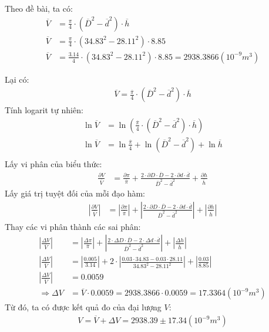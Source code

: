 \documentclass{article}
\begin{document}
Theo đề bài, ta có: 
\begin{align*}
    \overline{V} &= \frac{\pi}{4}\cdot(\overline{D}^2 - \overline{d}^2)\cdot\overline{h}\\
    \overline{V} &= \frac{\pi}{4}\cdot(34.83^2 - 28.11^2)\cdot 8.85\\
    \overline{V} &= \frac{3.14}{4}\cdot(34.83^2 - 28.11^2)\cdot 8.85 = 2938.3866(10^{-9} m^3)
\end{align*}

Lại có:
\begin{align*}
    \overline{V} = \frac{\overline{\pi}}{4}\cdot(\overline{D}^2 - \overline{d}^2)\cdot\overline{h}
\end{align*}
Tính logarit tự nhiên:
\begin{align*}
    \ln \overline{V} &= \ln(\frac{\overline{\pi}}{4}\cdot(\overline{D}^2 - \overline{d}^2)\cdot\overline{h})\\
    \ln \overline{V} &= \ln\frac{\overline{\pi}}{4} + \ln(\overline{D}^2 - \overline{d}^2) + \ln\overline{h}\\
\end{align*}
Lấy vi phân của biểu thức:
\begin{align*}
    \frac{\partial V}{\overline{V}} &= \frac{\partial\pi}{\overline{\pi}} + \frac{2\cdot\partial D\cdot \overline{D} - 2\cdot\partial d\cdot \overline{d}}{\overline{D}^2 - \overline{d}^2} + \frac{\partial h}{\overline{h}}
\end{align*}
Lấy giá trị tuyệt đối của mỗi đạo hàm:
\begin{align*}
    \left|\frac{\partial V}{\overline{V}}\right| &= \left|\frac{\partial\pi}{\overline{\pi}}\right| + \left|\frac{2\cdot\partial D\cdot \overline{D} - 2\cdot\partial d\cdot \overline{d}}{\overline{D}^2 - \overline{d}^2}\right| + \left|\frac{\partial h}{\overline{h}}\right|
\end{align*}
Thay các vi phân thành các sai phân:
\begin{align*}
    \left|\frac{\Delta V}{\overline{V}}\right| &= \left|\frac{\Delta\pi}{\overline{\pi}}\right| + \left|\frac{2\cdot\Delta D\cdot \overline{D} - 2\cdot\Delta d\cdot \overline{d}}{\overline{D}^2 - \overline{d}^2}\right| + \left|\frac{\Delta h}{\overline{h}}\right|\\
    \left|\frac{\Delta V}{\overline{V}}\right| &= \left|\frac{0.005}{3.14}\right| + 2\cdot\left|\frac{0.03\cdot 34.83 - 0.03\cdot 28.11}{34.83^2 - 28.11^2}\right| + \left|\frac{0.03}{8.85}\right|\\
    \left|\frac{\Delta V}{\overline{V}}\right| &= 0.0059 \\
    \Rightarrow \Delta V &= \overline{V}\cdot 0.0059 = 2938.3866 \cdot 0.0059 = 17.3364 (10^{-9}m^3)
\end{align*}
Từ đó, ta có được kết quả đo của đại lượng $V$:
\begin{align*}
    V = \overline{V} + \Delta V = 2938.39 \pm 17.34 (10^{-9} m^3)
\end{align*}
\end{document}
